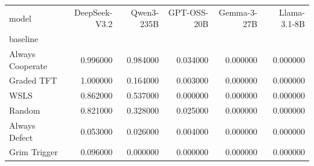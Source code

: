 \begin{tabular}{lrrrrr}
\toprule
model & DeepSeek-V3.2 & Qwen3-235B & GPT-OSS-20B & Gemma-3-27B & Llama-3.1-8B \\
baseline &  &  &  &  &  \\
\midrule
Always Cooperate & 0.996000 & 0.984000 & 0.034000 & 0.000000 & 0.000000 \\
Graded TFT & 1.000000 & 0.164000 & 0.003000 & 0.000000 & 0.000000 \\
WSLS & 0.862000 & 0.537000 & 0.000000 & 0.000000 & 0.000000 \\
Random & 0.821000 & 0.328000 & 0.025000 & 0.000000 & 0.000000 \\
Always Defect & 0.053000 & 0.026000 & 0.004000 & 0.000000 & 0.000000 \\
Grim Trigger & 0.096000 & 0.000000 & 0.000000 & 0.000000 & 0.000000 \\
\bottomrule
\end{tabular}
